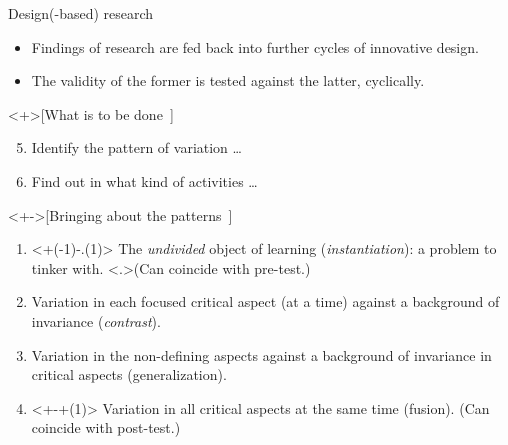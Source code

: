 \begin{frame}
  \begin{block}{Design(-based) 
    research~{\cite[p.~259]{NecessaryConditionsOfLearning}}}
    \begin{itemize}
      \item Findings of research are fed back into further cycles of innovative 
        design.
      \item The validity of the former is tested against the latter, 
        cyclically.
    \end{itemize}
  \end{block}
\end{frame}

\begin{frame}
  \begin{example}<+>[What is to be 
    done~{\cite[p.~257]{NecessaryConditionsOfLearning}}]
    \begin{enumerate}\setcounter{enumi}{4}
      \item Identify the pattern of variation \dots
      \item Find out in what kind of activities \dots
    \end{enumerate}
  \end{example}

  \begin{example}<+->[Bringing about the 
    patterns~{\cite[p.~263]{NecessaryConditionsOfLearning}}]
    \begin{enumerate}
      \item<+(-1)-.(1)> The \emph{undivided} object of learning 
        (\emph{instantiation}): a problem to tinker with.
        \alert<.>{(Can coincide with pre-test.)}

      \item<+> Variation in each focused critical aspect (at a time) against a 
        background of invariance (\emph{contrast}).

      \item<+> Variation in the non-defining aspects against a background of 
        invariance in critical aspects (generalization).

      \item<+-+(1)> Variation in all critical aspects at the same time 
        (fusion).
        \alert<+>{(Can coincide with post-test.)}
    \end{enumerate}
  \end{example}
\end{frame}


